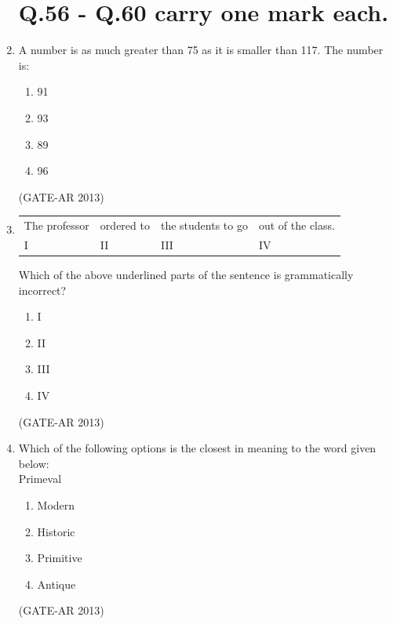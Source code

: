 \documentclass[a4paper,10pt]{article}
\begin{document}
\begin{enumerate}
\section*{Q.56 - Q.60 carry one mark each.}

    \item A number is as much greater than 75 as it is smaller than 117. The number is:
    \begin{multicols}{4}
	\begin{enumerate}
        \item 91
        \item 93
        \item 89
        \item 96
    \end{enumerate}
	\end{multicols}
    \hfill (GATE-AR 2013)

    \item \begin{tabular}{ l l l l }
    The professor & ordered to & the students to go & out of the class. \\
    I & II & III & IV \\
    \end{tabular}
    Which of the above underlined parts of the sentence is grammatically incorrect?
    \begin{multicols}{4}
	\begin{enumerate}
        \item I
        \item II
        \item III
        \item IV
    \end{enumerate}
	\end{multicols}
    \hfill (GATE-AR 2013)

    \item Which of the following options is the closest in meaning to the word given below: \\
    Primeval
    \begin{multicols}{4}
	\begin{enumerate}
        \item Modern
        \item Historic
        \item Primitive
        \item Antique
    \end{enumerate}
	\end{multicols}
    \hfill (GATE-AR 2013)


\end{enumerate}
\end{document}
